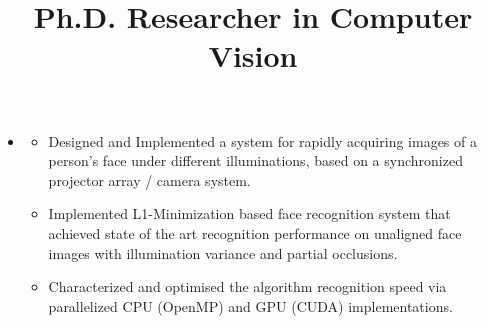 \documentclass[line,lm,rm,11pt]{res} %
\begin{document}
\begin{resume}
\begin{itemize}
\begin{position}
\begin{itemize}
	\end{itemize}
	\end{position}
\item
	\title{{\bf Ph.D. Researcher in Computer Vision}}
	\begin{position}
	\vspace{-2mm}
	\begin{itemize}
		\item Designed and Implemented a system for rapidly acquiring images of a person's face under different illuminations, based on a synchronized projector array / camera system.
		\item Implemented L1-Minimization based face recognition system that achieved state of the art recognition performance on unaligned face images with illumination variance and partial occlusions.
		\item Characterized and optimised the algorithm recognition speed via parallelized CPU (OpenMP) and GPU (CUDA) implementations.
	\end{itemize}
	\end{position}
\end{itemize}


\end{resume}
\end{document}
